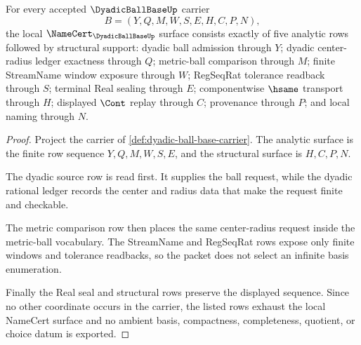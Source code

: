 \begin{theorem}
\label{thm:dyadic-ball-base-namecert-obligations}
For every accepted $\DyadicBallBaseUp$ carrier
$$
B=(Y,Q,M,W,S,E,H,C,P,N),
$$
the local $\NameCert_{\DyadicBallBaseUp}$ surface consists exactly of five analytic rows followed by structural support: dyadic ball admission through $Y$; dyadic center-radius ledger exactness through $Q$; metric-ball comparison through $M$; finite StreamName window exposure through $W$; RegSeqRat tolerance readback through $S$; terminal Real sealing through $E$; componentwise $\hsame$ transport through $H$; displayed $\Cont$ replay through $C$; provenance through $P$; and local naming through $N$.
\end{theorem}
\begin{proof}
Project the carrier of \autoref{def:dyadic-ball-base-carrier}. The analytic surface is the finite row sequence $Y,Q,M,W,S,E$, and the structural surface is $H,C,P,N$.

The dyadic source row is read first. It supplies the ball request, while the dyadic rational ledger records the center and radius data that make the request finite and checkable.

The metric comparison row then places the same center-radius request inside the metric-ball vocabulary. The StreamName and RegSeqRat rows expose only finite windows and tolerance readbacks, so the packet does not select an infinite basis enumeration.

Finally the Real seal and structural rows preserve the displayed sequence. Since no other coordinate occurs in the carrier, the listed rows exhaust the local NameCert surface and no ambient basis, compactness, completeness, quotient, or choice datum is exported.
\end{proof}

